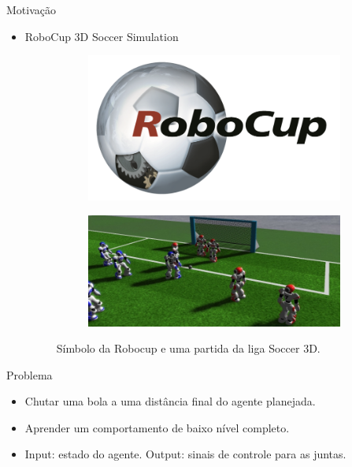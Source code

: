 \documentclass{beamer}
\begin{document}
\begin{frame}{Motivação}
\begin{itemize}
\item
	RoboCup 3D Soccer Simulation
\begin{figure}[ht]
  	\centering
  	\begin{subfigure}[b]{0.8\textwidth}
              \centering
	 		\includegraphics[height=0.3\textheight]{figures/RoboCup.png}	
     \end{subfigure}
     
	 \begin{subfigure}[b]{0.45\textwidth}
              \centering
	 		\includegraphics[height=0.3\textheight]{figures/SS3D.png}
	 \end{subfigure}
	     
	 \caption{Símbolo da Robocup e uma partida da liga Soccer 3D.}
	\label{fig:robocup}
\end{figure}	

\end{itemize}
\end{frame}

\begin{frame}{Problema}
\begin{itemize}
\setlength\itemsep{1em}
\item
	Chutar uma bola a uma distância final do agente planejada.
\item
	Aprender um comportamento de baixo nível completo.
\item
	Input: estado do agente. Output: sinais de controle para as juntas.
\end{itemize}
\end{frame}
\end{document}
